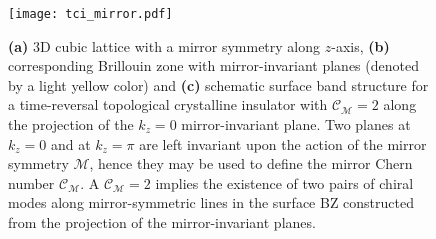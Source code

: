 \begin{figure}[H]
\centering
\texttt{[image: tci\_mirror.pdf]}
\caption[Mirror-symmetric 3D cubic lattice]{\textbf{(a)} 3D cubic lattice with a mirror symmetry along $z$-axis, \textbf{(b)} corresponding Brillouin zone with mirror-invariant planes (denoted by a light yellow color) and \textbf{(c)} schematic surface band structure for a time-reversal topological crystalline insulator with $\mathcal{C}_{\mathcal{M}} = 2$ along the projection of the $k_z = 0$ mirror-invariant plane. Two planes at $k_z = 0$ and at $k_z = \pi$ are left invariant upon the action of the mirror symmetry $\mathcal{M}$, hence they may be used to define the mirror Chern number $\mathcal{C}_{\mathcal{M}}$. A $\mathcal{C}_{\mathcal{M}} =2 $ implies the existence of two pairs of chiral modes along mirror-symmetric lines in the surface BZ constructed from the projection of the mirror-invariant planes.}
\label{fig:3d_mirror}
\end{figure}

